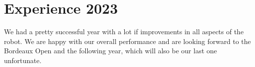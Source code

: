\section{Experience 2023}
We had a pretty successful year with a lot if improvements in all aspects of the robot.
We are happy with our overall performance and are looking forward to the Bordeaux Open and the following year, 
which will also be our last one unfortunate.
 
